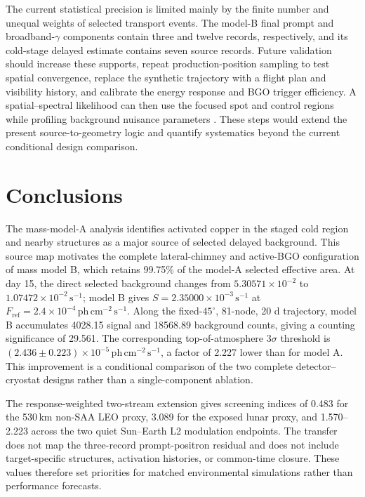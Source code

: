\documentclass[11pt]{article}
\newcommand{\phcms}{\ensuremath{\,\mathrm{ph\,cm^{-2}\,s^{-1}}}}
\newcommand{\cps}{\ensuremath{\,\mathrm{s^{-1}}}}
\newcommand{\fref}{F_{\mathrm{ref}}}
\begin{document}
The current statistical precision is limited mainly by the finite number and
unequal weights of selected transport events. The model-B final prompt and
broadband-$\gamma$ components contain three and twelve records, respectively,
and its cold-stage delayed estimate contains seven source records. Future
validation should increase these supports, repeat production-position sampling
to test spatial convergence, replace the synthetic trajectory with a flight
plan and visibility history, and calibrate the energy response and BGO trigger
efficiency. A spatial--spectral likelihood can then use the focused spot and
control regions while profiling background nuisance parameters
\cite{Cowan2011}. These steps would extend the present source-to-geometry logic
and quantify systematics beyond the current conditional design comparison.

\section{Conclusions}
\label{sec:conclusions}

The mass-model-A analysis identifies activated copper in the staged cold region
and nearby structures as a major source of selected delayed background. This
source map motivates the complete lateral-chimney and active-BGO configuration
of mass model B, which retains 99.75\% of the model-A selected effective area.
At day 15, the direct selected background changes from
$5.30571\times10^{-2}$ to $1.07472\times10^{-2}\cps$; model B gives
$S=2.35000\times10^{-3}\cps$ at $\fref=2.4\times10^{-4}\phcms$. Along the
fixed-$45^\circ$, 81-node, 20 d trajectory, model B accumulates 4028.15 signal
and 18568.89 background counts, giving a counting significance of 29.561. The
corresponding top-of-atmosphere $3\sigma$ threshold is
$(2.436\pm0.223)\times10^{-5}\phcms$, a factor of 2.227 lower than for model A.
This improvement is a conditional comparison of the two complete
detector--cryostat designs rather than a single-component ablation.

The response-weighted two-stream extension gives screening indices of 0.483
for the 530\,km non-SAA LEO proxy, 3.089 for the exposed lunar proxy, and
1.570--2.223 across the two quiet Sun--Earth L2 modulation endpoints. The
transfer does not map the three-record prompt-positron residual and does not
include target-specific structures, activation histories, or common-time
closure. These values therefore set priorities for matched environmental
simulations rather than performance forecasts.
\end{document}
